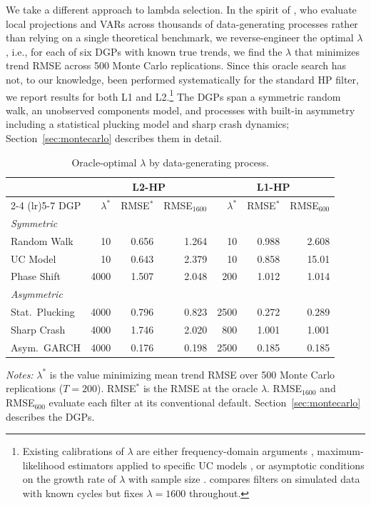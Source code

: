\documentclass[10pt]{article}
\begin{document}
We take a different approach to lambda selection. In the spirit of \citet{li_etal2024}, who evaluate local projections and VARs across thousands of data-generating processes rather than relying on a single theoretical benchmark, we reverse-engineer the optimal $\lambda$, i.e., for each of six DGPs with known true trends, we find the $\lambda$ that minimizes trend RMSE across 500 Monte Carlo replications. Since this oracle search has not, to our knowledge, been performed systematically for the standard HP filter, we report results for both L1 and L2.\footnote{Existing calibrations of $\lambda$ are either frequency-domain arguments \citep{ravn_uhlig2002}, maximum-likelihood estimators applied to specific UC models \citep{schlicht2005}, or asymptotic conditions on the growth rate of $\lambda$ with sample size \citep{phillips_jin2021}. \citet{hodrick2020} compares filters on simulated data with known cycles but fixes $\lambda = 1600$ throughout.} The DGPs span a symmetric random walk, an unobserved components model, and processes with built-in asymmetry including a statistical plucking model and sharp crash dynamics; Section~\ref{sec:montecarlo} describes them in detail.

\begin{table}[htbp]
\centering
\caption{Oracle-optimal $\lambda$ by data-generating process.}
\label{tab:oracle_lambdas}
\begin{tabular}{l rr rr rr}
\toprule
& \multicolumn{3}{c}{L2-HP} & \multicolumn{3}{c}{L1-HP} \\
\cmidrule(lr){2-4} \cmidrule(lr){5-7}
DGP & $\lambda^*$ & RMSE$^*$ & RMSE$_{1600}$ & $\lambda^*$ & RMSE$^*$ & RMSE$_{600}$ \\
\midrule
\multicolumn{7}{l}{\textit{Symmetric}} \\
Random Walk        &    10 & 0.656 & 1.264 &    10 & 0.988 & 2.608 \\
UC Model           &    10 & 0.643 & 2.379 &    10 & 0.858 & 15.01 \\
Phase Shift        &  4000 & 1.507 & 2.048 &   200 & 1.012 & 1.014 \\
\midrule
\multicolumn{7}{l}{\textit{Asymmetric}} \\
Stat.\ Plucking    &  4000 & 0.796 & 0.823 &  2500 & 0.272 & 0.289 \\
Sharp Crash        &  4000 & 1.746 & 2.020 &   800 & 1.001 & 1.001 \\
Asym.\ GARCH       &  4000 & 0.176 & 0.198 &  2500 & 0.185 & 0.185 \\
\bottomrule
\end{tabular}
\begin{tablenotes}
\small
\item \textit{Notes:} $\lambda^*$ is the value minimizing mean trend RMSE over 500 Monte Carlo replications ($T = 200$). RMSE$^*$ is the RMSE at the oracle $\lambda$. RMSE$_{1600}$ and RMSE$_{600}$ evaluate each filter at its conventional default. Section~\ref{sec:montecarlo} describes the DGPs.
\end{tablenotes}
\end{table}
\end{document}
